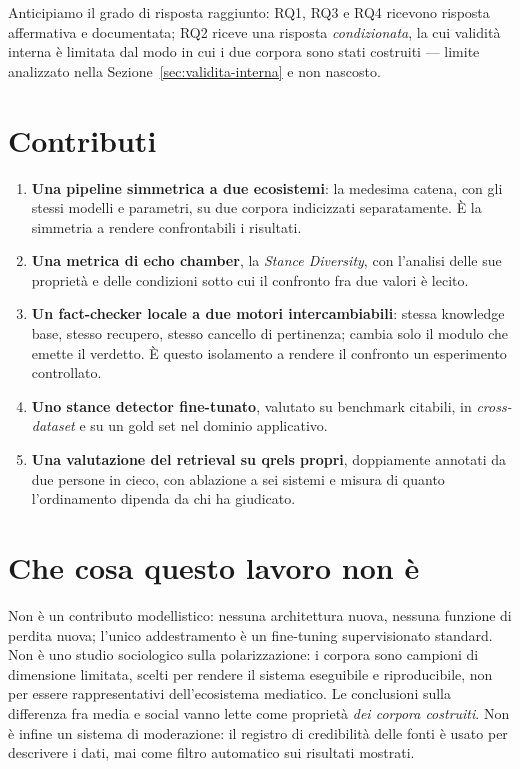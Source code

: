 \documentclass[11pt,a4paper]{report}
\begin{document}
Anticipiamo il grado di risposta raggiunto: RQ1, RQ3 e RQ4 ricevono risposta affermativa e
documentata; RQ2 riceve una risposta \emph{condizionata}, la cui validità interna è limitata
dal modo in cui i due corpora sono stati costruiti --- limite analizzato nella
Sezione~\ref{sec:validita-interna} e non nascosto.

\section{Contributi}
\begin{enumerate}[leftmargin=*]
  \item \textbf{Una pipeline simmetrica a due ecosistemi}: la medesima catena, con gli stessi
        modelli e parametri, su due corpora indicizzati separatamente. È la simmetria a rendere
        confrontabili i risultati.
  \item \textbf{Una metrica di echo chamber}, la \emph{Stance Diversity}, con l'analisi delle
        sue proprietà e delle condizioni sotto cui il confronto fra due valori è lecito.
  \item \textbf{Un fact-checker locale a due motori intercambiabili}: stessa knowledge base,
        stesso recupero, stesso cancello di pertinenza; cambia solo il modulo che emette il
        verdetto. È questo isolamento a rendere il confronto un esperimento controllato.
  \item \textbf{Uno stance detector fine-tunato}, valutato su benchmark citabili, in
        \emph{cross-dataset} e su un gold set nel dominio applicativo.
  \item \textbf{Una valutazione del retrieval su qrels propri}, doppiamente annotati da due
        persone in cieco, con ablazione a sei sistemi e misura di quanto l'ordinamento dipenda da
        chi ha giudicato.
\end{enumerate}

\section{Che cosa questo lavoro non è}
Non è un contributo modellistico: nessuna architettura nuova, nessuna funzione di perdita
nuova; l'unico addestramento è un fine-tuning supervisionato standard. Non è uno studio
sociologico sulla polarizzazione: i corpora sono campioni di dimensione limitata, scelti per
rendere il sistema eseguibile e riproducibile, non per essere rappresentativi dell'ecosistema
mediatico. Le conclusioni sulla differenza fra media e social vanno lette come proprietà
\emph{dei corpora costruiti}. Non è infine un sistema di moderazione: il registro di
credibilità delle fonti è usato per descrivere i dati, mai come filtro automatico sui
risultati mostrati.
\end{document}
